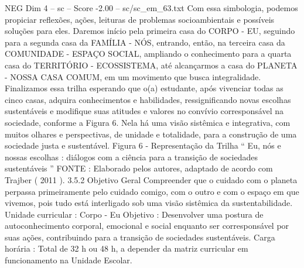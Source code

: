 \begin{textsample}{NEG Dim 4 – sc – Score -2.00 – sc/sc\_em\_63.txt}
Com essa simbologia, podemos propiciar reflexões, ações, leituras de problemas socioambientais e possíveis soluções para eles.
Daremos início pela primeira casa do CORPO - EU, seguindo para a segunda casa da FAMÍLIA - NÓS, entrando, então, na terceira casa da COMUNIDADE - ESPAÇO SOCIAL, ampliando o conhecimento para a quarta casa do TERRITÓRIO - ECOSSISTEMA, até alcançarmos a casa do PLANETA - NOSSA CASA COMUM, em um movimento que busca integralidade.
Finalizamos essa trilha esperando que o(a) estudante, após vivenciar todas as cinco casas, adquira conhecimentos e habilidades, ressignificando novas escolhas sustentáveis e modifique suas atitudes e valores no convívio corresponsável na sociedade, conforme a Figura 6.
Nela há uma visão sistêmica e integrativa, com muitos olhares e perspectivas, de unidade e totalidade, para a construção de uma sociedade justa e sustentável.
Figura 6 - Representação da Trilha “ Eu, nós e nossas escolhas : diálogos com a ciência para a transição de sociedades sustentáveis ” FONTE : Elaborado pelos autores, adaptado de acordo com Trajber ( 2011 ). 3.5.2 Objetivo Geral Compreender que o cuidado com o planeta perpassa primeiramente pelo cuidado comigo, com o outro e com o espaço em que vivemos, pois tudo está interligado sob uma visão sistêmica da sustentabilidade.
Unidade curricular : Corpo - Eu Objetivo : Desenvolver uma postura de autoconhecimento corporal, emocional e social enquanto ser corresponsável por suas ações, contribuindo para a transição de sociedades sustentáveis.
Carga horária : Total de 32 h ou 48 h, a depender da matriz curricular em funcionamento na Unidade Escolar.

\end{textsample}
